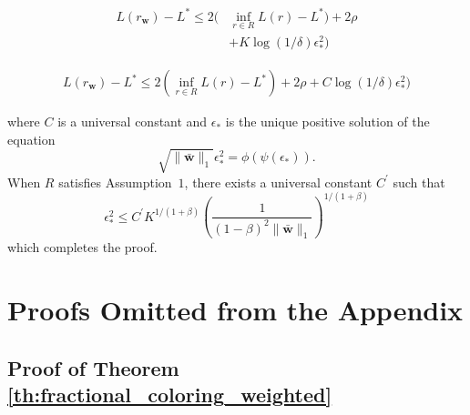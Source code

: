 \documentclass[letterpaper]{article} %
\def\DoubleColumnEnd{}
\def\SingleColumn{}
\def\SingleColumnEnd{}
\newcommand{\weight}{\mathbf{w}}
\newcommand{\verticeweight}{\bar{\mathbf{w}}}
\newcommand{\bayeserror}{L^*}
\newcommand{\risk}{L}
\newcommand{\normo}[1]{\|#1\|_1}
\newcommand{\complexbound}{\beta}
\begin{document}
    \begin{equation}
        \begin{aligned}
            \label{eq:main_result_proof_1}
            \risk(r_\weight{})-\bayeserror \le 2(&\inf_{r\in R}\risk(r)-\bayeserror) + 2\rho \\
            &+ K\log(1/\delta)\epsilon_*^2)
        \end{aligned}
    \end{equation}
    \DoubleColumnEnd
    \SingleColumn
    \begin{equation}
        \begin{aligned}
            \label{eq:main_result_proof_1}
            \risk(r_\weight{})-\bayeserror \le 2(\inf_{r\in R}\risk(r)-\bayeserror) + 2\rho + C\log(1/\delta)\epsilon_*^2)
        \end{aligned}
    \end{equation}
    \SingleColumnEnd
    where $C$ is a universal constant and $\epsilon_*$ is the unique positive solution of the equation
    \[\sqrt{\normo{\verticeweight{}}}\epsilon_*^2=\phi(\psi(\epsilon_*)).\]
    When $ R$ satisfies Assumption~$1$, there exists a universal constant $C^\prime$ such that
    \[\epsilon_*^2\le C^\prime K^{1/(1+\complexbound{})}(\frac{1}{(1-\complexbound{})^2\normo{\verticeweight{}}})^{1/(1+\complexbound{})}\]
    which completes the proof.


\section{Proofs Omitted from the Appendix} %
\label{sec:proofs_of_the_appendix}

\subsection{Proof of Theorem \ref{th:fractional_coloring_weighted}} %
\label{sub:proof_of_theorem_th:fractional_coloring_weighted}
\end{document}
